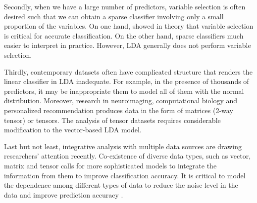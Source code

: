 Secondly, when we have a large number of predictors, variable selection is often desired such that we can obtain a sparse classifier involving only a small proportion of the variables. On one hand, \citet{fan2008high, bickel2008} showed in theory that variable selection is critical for accurate classification. On the other hand, sparse classifiers much easier to interpret in practice. However, LDA generally does not perform variable selection. 



Thirdly, contemporary datasets often have complicated structure that renders the linear classifier in LDA inadequate. For example, in the presence of thousands of predictors, it may be inappropriate them to model all of them with the normal distribution. Moreover, research in neuroimaging, computational biology and personalized recommendation produces data in the form of matrices (2-way tensor) or tensors. The analysis of tensor datasets requires considerable modification to the vector-based LDA model. 

Last but not least, integrative analysis with multiple data sources are drawing researchers' attention recently. Co-existence of diverse data types, such as vector, matrix and tensor calls for more sophisticated models to integrate the information from them to improve classification accuracy. It is critical to model the dependence among different types of data to reduce the noise level in the data and improve prediction accuracy \citep{catch}. 


